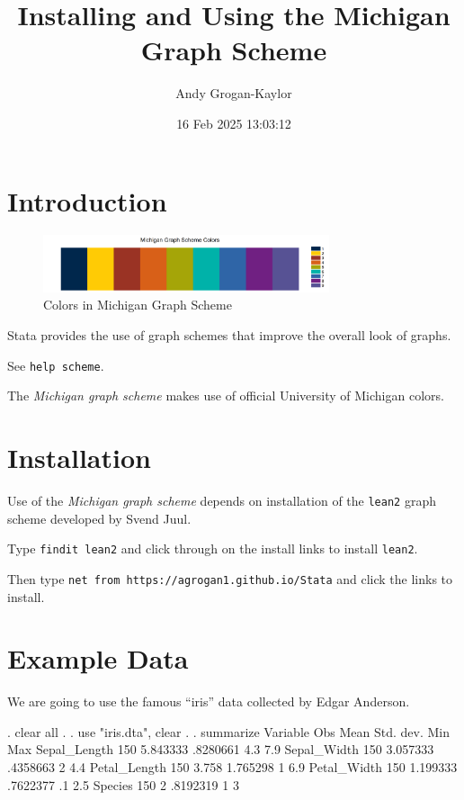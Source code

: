\documentclass[
]{article}
\title{Installing and Using the Michigan Graph Scheme}
\author{Andy Grogan-Kaylor}
\date{16 Feb 2025 13:03:12}
\begin{document}
\maketitle

\section{Introduction}\label{introduction}



\begin{figure}
\centering
\includegraphics[width=0.75\textwidth,height=\textheight]{MichiganColorsStata.png}
\caption{Colors in Michigan Graph Scheme}
\end{figure}

Stata provides the use of graph schemes that improve the overall look of
graphs.

See \texttt{help\ scheme}.

The \emph{Michigan graph scheme} makes use of official University of
Michigan colors.

\section{Installation}\label{installation}

Use of the \emph{Michigan graph scheme} depends on installation of the
\texttt{lean2} graph scheme developed by Svend Juul.

Type \texttt{findit\ lean2} and click through on the install links to
install \texttt{lean2}.

Then type \texttt{net\ from\ https://agrogan1.github.io/Stata} and click
the links to install.

\section{Example Data}\label{example-data}

We are going to use the famous ``iris'' data collected by Edgar
Anderson.

\begin{stlog}
. clear all
{\smallskip}
.     
. use "iris.dta", clear
{\smallskip}
. 
. summarize
{\smallskip}
    Variable {\VBAR}        Obs        Mean    Std. dev.       Min        Max
Sepal_Length {\VBAR}        150    5.843333    .8280661        4.3        7.9
 Sepal_Width {\VBAR}        150    3.057333    .4358663          2        4.4
Petal_Length {\VBAR}        150       3.758    1.765298          1        6.9
 Petal_Width {\VBAR}        150    1.199333    .7622377         .1        2.5
     Species {\VBAR}        150           2    .8192319          1          3
\end{stlog}
\end{document}
